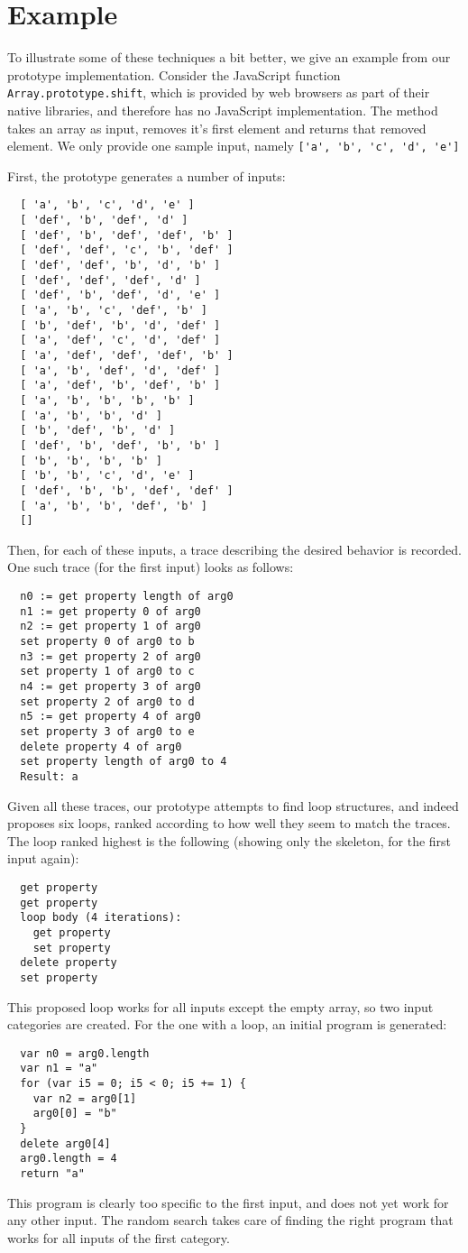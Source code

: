 \documentclass[]{article}
\newcommand{\code}[1]{\lstinline{#1}}
\begin{document}
\section{Example}

To illustrate some of these techniques a bit better, we give an example from
our prototype implementation.  Consider the JavaScript function
\code{Array.prototype.shift}, which is provided by web browsers as part of
their native libraries, and therefore has no JavaScript implementation.
The method takes an array as input, removes it's first element and returns
that removed element.  We only provide one sample input, namely
\code{['a', 'b', 'c', 'd', 'e']}

First, the prototype generates a number of inputs:
\begin{verbatim}
  [ 'a', 'b', 'c', 'd', 'e' ]
  [ 'def', 'b', 'def', 'd' ]
  [ 'def', 'b', 'def', 'def', 'b' ]
  [ 'def', 'def', 'c', 'b', 'def' ]
  [ 'def', 'def', 'b', 'd', 'b' ]
  [ 'def', 'def', 'def', 'd' ]
  [ 'def', 'b', 'def', 'd', 'e' ]
  [ 'a', 'b', 'c', 'def', 'b' ]
  [ 'b', 'def', 'b', 'd', 'def' ]
  [ 'a', 'def', 'c', 'd', 'def' ]
  [ 'a', 'def', 'def', 'def', 'b' ]
  [ 'a', 'b', 'def', 'd', 'def' ]
  [ 'a', 'def', 'b', 'def', 'b' ]
  [ 'a', 'b', 'b', 'b', 'b' ]
  [ 'a', 'b', 'b', 'd' ]
  [ 'b', 'def', 'b', 'd' ]
  [ 'def', 'b', 'def', 'b', 'b' ]
  [ 'b', 'b', 'b', 'b' ]
  [ 'b', 'b', 'c', 'd', 'e' ]
  [ 'def', 'b', 'b', 'def', 'def' ]
  [ 'a', 'b', 'b', 'def', 'b' ]
  []
\end{verbatim}
Then, for each of these inputs, a trace describing the desired behavior
is recorded.  One such trace (for the first input) looks as follows:
\begin{verbatim}
  n0 := get property length of arg0
  n1 := get property 0 of arg0
  n2 := get property 1 of arg0
  set property 0 of arg0 to b
  n3 := get property 2 of arg0
  set property 1 of arg0 to c
  n4 := get property 3 of arg0
  set property 2 of arg0 to d
  n5 := get property 4 of arg0
  set property 3 of arg0 to e
  delete property 4 of arg0
  set property length of arg0 to 4
  Result: a
\end{verbatim}
Given all these traces, our prototype attempts to find loop structures,
and indeed proposes six loops, ranked according to how well they seem to
match the traces.  The loop ranked highest is the following (showing
only the skeleton, for the first input again):
\begin{verbatim}
  get property
  get property
  loop body (4 iterations):
    get property
    set property
  delete property
  set property
\end{verbatim}
This proposed loop works for all inputs except the empty array, so two
input categories are created.
For the one with a loop, an initial program is generated:
\begin{verbatim}
  var n0 = arg0.length
  var n1 = "a"
  for (var i5 = 0; i5 < 0; i5 += 1) {
    var n2 = arg0[1]
    arg0[0] = "b"
  }
  delete arg0[4]
  arg0.length = 4
  return "a"
\end{verbatim}
This program is clearly too specific to the first input, and does
not yet work for any other input.
The random search takes care of finding the right program that
works for all inputs of the first category.
\end{document}
